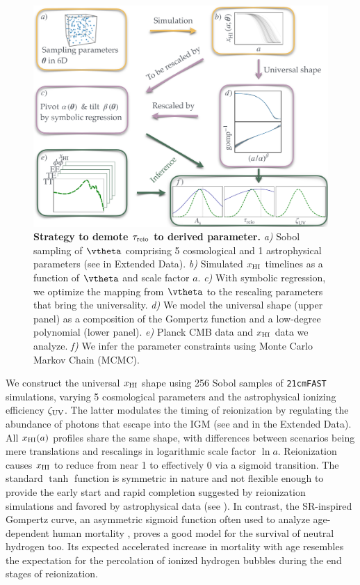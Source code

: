 \begin{figure}[tb]
\centering
\includegraphics[width=\linewidth]{figs/big_fig.pdf}
\caption{\textbf{Strategy to demote $\tau_{\mathrm{reio}}$ to derived parameter.}
\emph{a)} Sobol sampling of $\vtheta$ comprising 5 cosmological and 1
astrophysical parameters (see  in Extended Data).
\emph{b)} Simulated $x_{\mathrm{HI}}$ timelines as a function of $\vtheta$ and
scale factor $a$.
\emph{c)} With symbolic regression, we optimize the mapping from
$\vtheta$ to the rescaling parameters that bring the universality.
\emph{d)} We model the universal shape (upper panel) as a composition of
the Gompertz function and a low-degree polynomial (lower panel).
\emph{e)} Planck CMB data and $x_{\mathrm{HI}}$ data we analyze.
\emph{f)} We infer the parameter constraints using Monte Carlo Markov
Chain (MCMC).}
\label{fig:big}
\end{figure}

We construct the universal $x_{\mathrm{HI}}$ shape using 256 Sobol samples
of \texttt{21cmFAST} simulations, varying 5 cosmological parameters
and the astrophysical ionizing efficiency $\zeta_\mathrm{UV}$.
The latter modulates the timing of reionization by regulating the
abundance of photons that escape into the IGM (see 
and  in the Extended Data).
All $x_{\mathrm{HI}}(a)$ profiles share the same shape, with differences between
scenarios being mere translations and rescalings in logarithmic scale
factor $\ln a$.
Reionization causes $x_{\mathrm{HI}}$ to reduce from near 1 to effectively 0 via a
sigmoid transition.
The standard $\tanh$ function is symmetric in nature and not flexible
enough to provide the early start and rapid completion suggested by
reionization simulations \cite{Trac2018, Doussot2019} and favored by
astrophysical data (see ).
In contrast, the SR-inspired Gompertz curve, an asymmetric sigmoid
function often used to analyze age-dependent human mortality
\cite{Gompertz1825}, proves a good model for the survival of neutral
hydrogen too.
Its expected accelerated increase in mortality with age resembles the
expectation for the percolation of ionized hydrogen bubbles during the
end stages of reionization.

